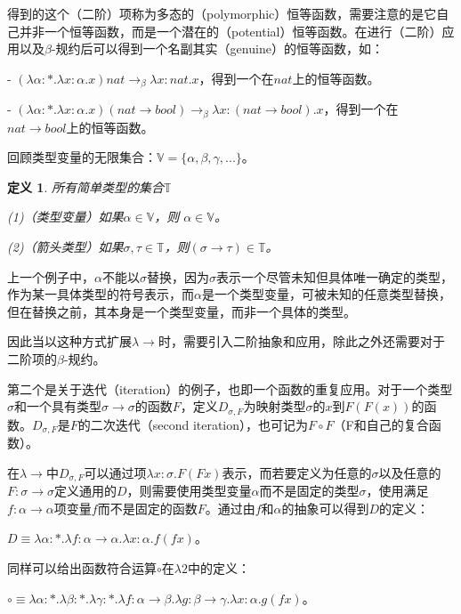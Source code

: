 \documentclass[UTF8]{article}
\newtheorem{thm}{定义}[section]
\begin{document}
		得到的这个（二阶）项称为多态的（polymorphic）恒等函数，需要注意的是它自己并非一个恒等函数，而是一个潜在的（potential）恒等函数。在进行（二阶）应用以及$\beta$-规约后可以得到一个名副其实（genuine）的恒等函数，如：
		
		\noindent
		- $(\lambda\alpha:*.\lambda x:\alpha.x)nat\rightarrow_\beta\lambda x:nat.x$，得到一个在$nat$上的恒等函数。
		
		\noindent
		- $(\lambda\alpha:*.\lambda x:\alpha.x)(nat\rightarrow bool)\rightarrow_\beta\lambda x:(nat\rightarrow bool).x$，得到一个在$nat\rightarrow bool$上的恒等函数。
		
		回顾类型变量的无限集合：$\mathbb{V} = \{\alpha, \beta, \gamma, ...\}$。
		
		\begin{thm} 所有简单类型的集合$\mathbb{T}$
			
			(1)（类型变量）如果$\alpha \in \mathbb{V}$，则 $\alpha \in \mathbb{V}$。
			
			(2)（箭头类型）如果$\sigma,\tau\in\mathbb{T}$，则$(\sigma\rightarrow\tau)\in\mathbb{T}$。
			
		\end{thm}
	
		上一个例子中，$\alpha$不能以$\sigma$替换，因为$\sigma$表示一个尽管未知但具体唯一确定的类型，作为某一具体类型的符号表示，而$\alpha$是一个类型变量，可被未知的任意类型替换，但在替换之前，其本身是一个类型变量，而非一个具体的类型。
		
		因此当以这种方式扩展$\lambda{\rightarrow}$时，需要引入二阶抽象和应用，除此之外还需要对于二阶项的$\beta$-规约。
		
		第二个是关于迭代（iteration）的例子，也即一个函数的重复应用。对于一个类型$\sigma$和一个具有类型$\sigma\rightarrow\sigma$的函数$F$，定义$D_{\sigma,F}$为映射类型$\sigma$的$x$到$F(F(x))$的函数。$D_{\sigma,F}$是$F$的二次迭代（second iteration），也可记为$F\circ F$（F和自己的复合函数）。
		
		在$\lambda{\rightarrow}$中$D_{\sigma,F}$可以通过项$\lambda x:\sigma.F(F x)$表示，而若要定义为任意的$\sigma$以及任意的$F:\sigma\rightarrow\sigma$定义通用的$D$，则需要使用类型变量$\alpha$而不是固定的类型$\sigma$，使用满足$f:\alpha\rightarrow\alpha$项变量$f$而不是固定的函数$F$。通过由$f$和$\alpha$的抽象可以得到$D$的定义：
		
		$D\equiv\lambda\alpha:*.\lambda f:\alpha\rightarrow\alpha.\lambda x:\alpha.f(fx)$。
		
		同样可以给出函数符合运算$\circ$在$\lambda{2}$中的定义：
		
		$\circ\equiv\lambda\alpha:*.\lambda\beta:*.\lambda\gamma:*.\lambda f:\alpha\rightarrow\beta.\lambda g:\beta\rightarrow\gamma.\lambda x:\alpha.g(fx)$。
		
\end{document}
